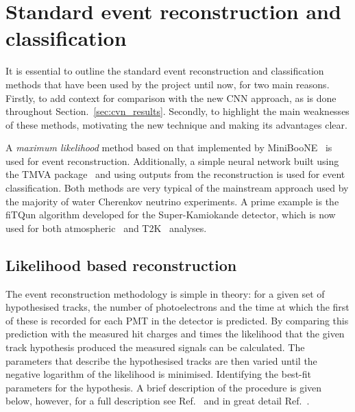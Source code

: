 \section{Standard event reconstruction and classification} %
\label{sec:cvn_old} %

It is essential to outline the standard event reconstruction and classification methods that have
been used by the \chips project until now, for two main reasons. Firstly, to add context for
comparison with the new CNN approach, as is done throughout Section.~\ref{sec:cvn_results}.
Secondly, to highlight the main weaknesses of these methods, motivating the new technique and
making its advantages clear.

A \emph{maximum likelihood} method based on that implemented by MiniBooNE~\cite{patterson2009} is
used for event reconstruction. Additionally, a simple neural network built using the TMVA
package~\cite{hocker2007} and using outputs from the reconstruction is used for event
classification. Both methods are very typical of the mainstream approach used by the majority of
water Cherenkov neutrino experiments. A prime example is the fiTQun algorithm developed for the
Super-Kamiokande detector, which is now used for both atmospheric~\cite{jiang2019} and
T2K~\cite{missert2017} analyses.

\subsection{Likelihood based reconstruction} %
\label{sec:cvn_old_reco} %

The event reconstruction methodology is simple in theory: for a given set of hypothesised tracks,
the number of photoelectrons and the time at which the first of these is recorded for each PMT in
the detector is predicted. By comparing this prediction with the measured hit charges and times
the likelihood that the given track hypothesis produced the measured signals can be calculated.
The parameters that describe the hypothesised tracks are then varied until the negative logarithm
of the likelihood is minimised. Identifying the best-fit parameters for the hypothesis. A brief
description of the procedure is given below, however, for a full description see
Ref.~\cite{blake2016} and in great detail Ref.~\cite{perch2017}.

